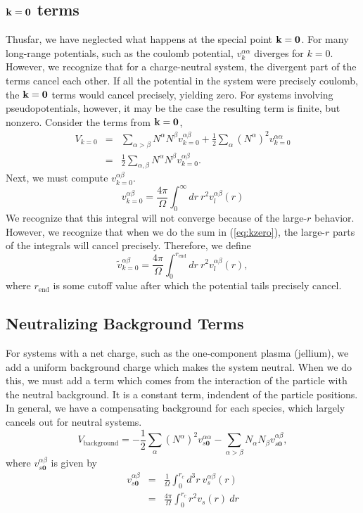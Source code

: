 \documentclass{article}
\begin{document}
\subsection{$\mathbf{k}=\mathbf{0}$ terms}
Thusfar, we have neglected what happens at the special point $\mathbf{k} =
\mathbf{0}$.  For many long-range potentials, such as the coulomb
potential, $v_k^{\alpha \alpha}$ diverges for $k=0$.  However, we
recognize that for a charge-neutral system, the divergent part of the
terms cancel each other.  If all the potential in the system were
precisely coulomb, the $\mathbf{k}=\mathbf{0}$ terms would cancel precisely,
yielding zero.  For systems involving pseudopotentials, however, it
may be the case the resulting term is finite, but nonzero.  Consider
the terms from $\mathbf{k}=\mathbf{0}$,
\begin{eqnarray}
V_{k=0} & = & \sum_{\alpha>\beta} N^\alpha N^\beta v^{\alpha \beta}_{k=0}
+ \frac{1}{2} \sum_\alpha \left(N^{\alpha}\right)^2 v^{\alpha\alpha}_{k=0} \\
& = & \frac{1}{2} \sum_{\alpha,\beta} N^\alpha N^\beta v^{\alpha
  \beta}_{k=0}.
\label{eq:kzero}
\end{eqnarray}
Next, we must compute $v^{\alpha \beta}_{k=0}$.  
\begin{equation}
v^{\alpha \beta}_{k=0} = \frac{4 \pi}{\Omega} \int_0^\infty dr\ r^2
v_l^{\alpha \beta}(r)
\end{equation}
We recognize that this integral will not converge because of the
large-$r$ behavior.  However, we recognize that when we do the sum in
(\ref{eq:kzero}), the large-$r$ parts of the integrals will cancel
precisely.  Therefore, we define
\begin{equation}
\tilde{v}^{\alpha \beta}_{k=0} = \frac{4 \pi}{\Omega} 
\int_0^{r_\text{end}} dr\ r^2 v_l^{\alpha \beta}(r),
\end{equation}
where $r_\text{end}$ is some cutoff value after which the potential
tails precisely cancel.

\subsection{Neutralizing Background Terms}
For systems with a net charge, such as the one-component plasma
(jellium), we add a uniform background charge which makes the system
neutral.  When we do this, we must add a term which comes from the
interaction of the particle with the neutral background.  It is a
constant term, indendent of the particle positions.  In general, we
have a compensating background for each species, which largely cancels
out for neutral systems.
\begin{equation}
V_\text{background} = -\frac{1}{2} \sum_\alpha \left(N^\alpha\right)^2 
v^{\alpha \alpha}_{s\mathbf{0}}
-\sum_{\alpha > \beta} N_\alpha N_\beta
v^{\alpha\beta}_{s\mathbf{0}},
\end{equation}
where $v^{\alpha \beta}_{s\mathbf{0}}$ is given by
\begin{eqnarray}
v^{\alpha \beta}_{s\mathbf{0}} & = & \frac{1}{\Omega} \int_0^{r_c} d^3 r\ 
v^{\alpha \beta}_s(r) \\
& = & \frac{4 \pi}{\Omega} \int_0^{r_c} r^2 v_s(r) \ dr \nonumber
\end{eqnarray}
\end{document}

